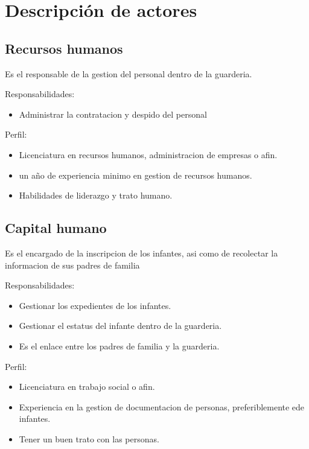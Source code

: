 \section{Descripción de actores}

\begin{Usuario}{\hypertarget{recursosHumanos}{\subsection{Recursos humanos}}}{
	Es el responsable de la gestion del personal dentro de la guarderia.
}
    \item[Responsabilidades:] \cdtEmpty
    \begin{itemize}
		\item Administrar la contratacion y despido del personal
		
    \end{itemize}

	\item[Perfil:] \cdtEmpty
    \begin{itemize}
		\item Licenciatura en recursos humanos, administracion de empresas o afin.
		\item un año de experiencia minimo en gestion de recursos humanos.
		\item Habilidades de liderazgo y trato humano.
    \end{itemize}
\end{Usuario}

\begin{Usuario}{\hypertarget{capitalHumano}{\subsection{Capital humano}}}{
	Es el encargado de la inscripcion de los infantes, asi como de recolectar la informacion de sus padres de familia
}
    \item[Responsabilidades:] \cdtEmpty
    \begin{itemize}
		\item Gestionar los expedientes de los infantes.
		\item Gestionar el estatus del infante dentro de la guarderia.
		\item Es el enlace entre los padres de familia y la guarderia.
    \end{itemize}

	\item[Perfil:] \cdtEmpty
    \begin{itemize}
		\item Licenciatura en trabajo social o afin.
		\item Experiencia en la gestion de documentacion de personas, preferiblemente ede               infantes.
		\item Tener un buen trato con las personas.
    \end{itemize}
\end{Usuario}

